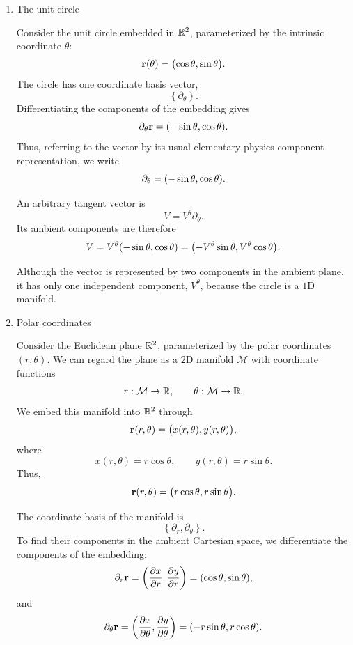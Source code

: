 \begin{enumerate}[(1)]
				Thus, we are not really showing what the vector really is, we 
				are showing how it would look like in the ambient space $\R^3$,
				which is much more intuitive and physical for us.


			\item The unit circle

				Consider the unit circle embedded in $\mathbb{R}^2$, parameterized by
				the intrinsic coordinate $\theta$:
				\[
					\vb{r}(\theta)
					=
					\bigl(
						\cos\theta,\sin\theta
					\bigr).
				\]
				The circle has one coordinate basis vector,
				\[
					\left\{
						\partial_\theta
					\right\}.
				\]
				Differentiating the components of the embedding gives
				\[
					\partial_\theta\vb{r}
					=
					\pqty{
						-\sin\theta,
						\cos\theta
					}.
				\]
				Thus, referring to the vector by its usual elementary-physics
				component representation, we write
				\[
					\partial_\theta
					=
					\pqty{
						-\sin\theta,
						\cos\theta
					}.
				\]

				An arbitrary tangent vector is
				\[
					V=V^\theta\partial_\theta.
				\]
				Its ambient components are therefore
				\[
					V
					=
					V^\theta
					\pqty{
						-\sin\theta,
						\cos\theta
					}
					=
					\pqty{
						-V^\theta\sin\theta,
						V^\theta\cos\theta
					}.
				\]

				Although the vector is represented by two components in the
				ambient plane, it has only one independent component, $V^\theta$,
				because the circle is a $1$D manifold.
			\item Polar coordinates

				Consider the Euclidean plane $\mathbb{R}^2$, parameterized by the
				polar coordinates $(r,\theta)$. We can regard the plane as a
				$2$D manifold $\mathcal M$ with coordinate functions
				\[
					r:\mathcal M\to\mathbb{R},
					\qquad
					\theta:\mathcal M\to\mathbb{R}.
				\]
				We embed this manifold into $\mathbb{R}^2$ through
				\[
					\vb{r}(r,\theta)
					=
					\bigl(
						x(r,\theta),
						y(r,\theta)
					\bigr),
				\]
				where
				\[
					x(r,\theta)=r\cos\theta,
					\qquad
					y(r,\theta)=r\sin\theta.
				\]
				Thus,
				\[
					\vb{r}(r,\theta)
					=
					\bigl(
						r\cos\theta,
						r\sin\theta
					\bigr).
				\]

				The coordinate basis of the manifold is
				\[
					\left\{
						\partial_r,\partial_\theta
					\right\}.
				\]
				To find their components in the ambient Cartesian space, we
				differentiate the components of the embedding:
				\[
					\partial_r\vb{r}
					=
					\pqty{
						\pdv{x}{r},
						\pdv{y}{r}
					}
					=
					\pqty{
						\cos\theta,
						\sin\theta
					},
				\]
				and
				\[
					\partial_\theta\vb{r}
					=
					\pqty{
						\pdv{x}{\theta},
						\pdv{y}{\theta}
					}
					=
					\pqty{
						-r\sin\theta,
						r\cos\theta
					}.
				\]


\end{enumerate}
